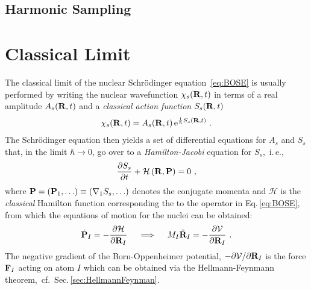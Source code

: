 
\subsection{Harmonic Sampling}

\section{Classical Limit}
The classical limit of the nuclear Schr\"odinger equation~\eqref{eq:BOSE} is usually performed by writing the nuclear wavefunction $\chi_s ({\bf R}, t)$ in terms of a real amplitude $A_s({\bf R}, t)$ and a \emph{classical action function} $S_s({\bf R}, t)$~\cite{Dirac1981,Landau2013,Marx2009}
\begin{align}
	\chi_s({\bf R}, t) = A_s({\bf R}, t) \, {\rm e}^{\frac{\im}{\hbar} S_s({\bf R}, t)}~.
	\label{eq:class.1}
\end{align}
The Schr\"odinger equation then yields a set of differential equations for $A_s$ and $S_s$ that, in the limit $\hbar \to 0$, go over to a \emph{Hamilton-Jacobi} equation for $S_s$,~i.\,e.,~
\begin{align}
  \frac{\partial S_s}{\partial t} + \mathcal H \left({\bf R}, {\bf P}\right)
  = 0~,
  \label{eq:HamiltonJacobi}
\end{align}
where ${\bf P} = ({\bf P}_1, \ldots) \equiv ({\bf \nabla}_1 S_s, \ldots)$ denotes the conjugate momenta and $\mathcal H$ is the \emph{classical} Hamilton function corresponding the to the operator in Eq.\,\eqref{eq:BOSE}, from which the equations of motion for the nuclei can be obtained:
\begin{align}
  \dot{{\bf P}}_I 
    = -\frac{\partial \mathcal H}{\partial {\bf R}_I}
    \quad\implies\quad M_I \ddot{\bf R}_I
    = -\frac{\partial \mathcal V}{\partial {\bf R}_I}~.
\end{align}
The negative gradient of the Born-Oppenheimer potential, 
$-\partial \mathcal V / \partial {\bf R}_I$ is the force ${\bf F}_I$ acting on atom $I$ which can be obtained via the Hellmann-Feynmann theorem,~cf.~Sec.\,\ref{sec:HellmannFeynman}.

